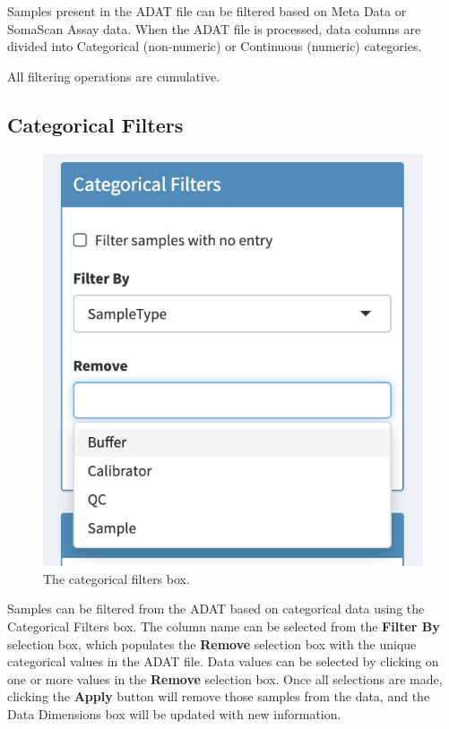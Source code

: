 \documentclass[
]{book}
\begin{document}
Samples present in the ADAT file can be filtered based on Meta Data or SomaScan Assay data. When the ADAT file is processed, data columns are divided into Categorical (non-numeric) or Continuous (numeric) categories.

All filtering operations are cumulative.

\hypertarget{categorical-filters}{%
\subsection{Categorical Filters}\label{categorical-filters}}

\begin{figure}
\centering
\includegraphics{images/CategoricalFilters.png}
\caption{The categorical filters box.}
\end{figure}

Samples can be filtered from the ADAT based on categorical data using the Categorical Filters box. The column name can be selected from the \textbf{Filter By} selection box, which populates the \textbf{Remove} selection box with the unique categorical values in the ADAT file. Data values can be selected by clicking on one or more values in the \textbf{Remove} selection box. Once all selections are made, clicking the \textbf{Apply} button will remove those samples from the data, and the Data Dimensions box will be updated with new information.
\end{document}
